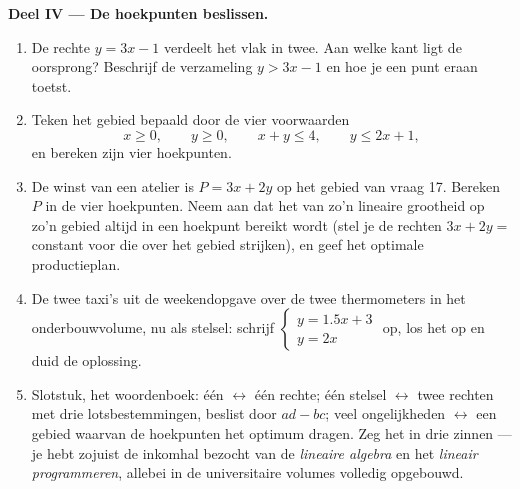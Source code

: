 \begin{problem}
\medskip
\noindent\textbf{Deel IV --- De hoekpunten beslissen.}
\begin{enumerate}[resume]
  \item De rechte $y = 3x - 1$ verdeelt het vlak in twee. Aan welke kant ligt
        de oorsprong? Beschrijf de verzameling $y > 3x - 1$ en hoe je een
        punt eraan toetst.
  \item Teken het gebied bepaald door de vier voorwaarden
        \[
        x \geq 0, \qquad y \geq 0, \qquad x + y \leq 4,
        \qquad y \leq 2x + 1,
        \]
        en bereken zijn vier hoekpunten.
  \item De winst van een atelier is $P = 3x + 2y$ op het gebied van vraag 17.
        Bereken $P$ in de vier hoekpunten. Neem aan dat het  van zo'n
        lineaire grootheid op zo'n gebied altijd in een hoekpunt bereikt wordt
        (stel je de rechten $3x + 2y = $ constant voor die over het gebied
        strijken), en geef het optimale productieplan.
  \item De twee taxi's uit de weekendopgave over de twee thermometers in het
        onderbouwvolume, nu als stelsel: schrijf
        $\begin{cases} y = 1.5x + 3 \\ y = 2x \end{cases}$ op, los het op en
        duid de oplossing.
  \item Slotstuk, het woordenboek: één  $\leftrightarrow$ één
        rechte; één stelsel $\leftrightarrow$ twee rechten met drie
        lotsbestemmingen, beslist door $ad - bc$; veel ongelijkheden
        $\leftrightarrow$ een gebied waarvan de hoekpunten het optimum dragen.
        Zeg het in drie zinnen --- je hebt zojuist de inkomhal bezocht van de
        \emph{lineaire algebra} en het \emph{lineair programmeren}, allebei in
        de universitaire volumes volledig opgebouwd.
\end{enumerate}
\end{problem}
